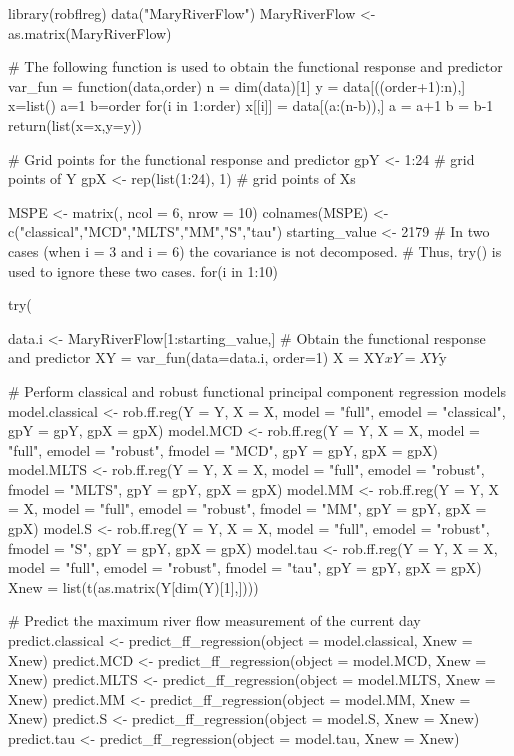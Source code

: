 \begin{smallexample}
\begin{smallverbatim}
library(robflreg)
data("MaryRiverFlow")
MaryRiverFlow <- as.matrix(MaryRiverFlow)

# The following function is used to obtain the functional response and predictor
var_fun = function(data,order){
  n = dim(data)[1]
  y = data[((order+1):n),]
  x=list()
  a=1
  b=order
  for(i in 1:order){
    x[[i]] = data[(a:(n-b)),]
    a = a+1
    b = b-1
  }
  return(list(x=x,y=y))
}

# Grid points for the functional response and predictor
gpY <- 1:24 # grid points of Y
gpX <- rep(list(1:24), 1) # grid points of Xs

MSPE <- matrix(, ncol = 6, nrow = 10)
colnames(MSPE) <- c("classical","MCD","MLTS","MM","S","tau")
starting_value <- 2179
# In two cases (when i = 3 and i = 6) the covariance is not decomposed.
# Thus, try() is used to ignore these two cases.
for(i in 1:10){
  try({
  data.i <- MaryRiverFlow[1:starting_value,]
  # Obtain the functional response and predictor
  XY = var_fun(data=data.i, order=1)
  X = XY$x
  Y = XY$y

  # Perform classical and robust functional principal component regression models
  model.classical <- rob.ff.reg(Y = Y, X = X, model = "full", emodel = "classical",
                         gpY = gpY, gpX = gpX)
  model.MCD <- rob.ff.reg(Y = Y, X = X, model = "full", emodel = "robust",
                         fmodel = "MCD", gpY = gpY, gpX = gpX)
  model.MLTS <- rob.ff.reg(Y = Y, X = X, model = "full", emodel = "robust",
                         fmodel = "MLTS", gpY = gpY, gpX = gpX)
  model.MM <- rob.ff.reg(Y = Y, X = X, model = "full", emodel = "robust",
                         fmodel = "MM", gpY = gpY, gpX = gpX)
  model.S <- rob.ff.reg(Y = Y, X = X, model = "full", emodel = "robust",
                         fmodel = "S", gpY = gpY, gpX = gpX)
  model.tau <- rob.ff.reg(Y = Y, X = X, model = "full", emodel = "robust",
                         fmodel = "tau", gpY = gpY, gpX = gpX)
  Xnew = list(t(as.matrix(Y[dim(Y)[1],])))
  
  # Predict the maximum river flow measurement of the current day
  predict.classical <- predict_ff_regression(object = model.classical, Xnew = Xnew)
  predict.MCD <- predict_ff_regression(object = model.MCD, Xnew = Xnew)
  predict.MLTS <- predict_ff_regression(object = model.MLTS, Xnew = Xnew)
  predict.MM <- predict_ff_regression(object = model.MM, Xnew = Xnew)
  predict.S <- predict_ff_regression(object = model.S, Xnew = Xnew)
  predict.tau <- predict_ff_regression(object = model.tau, Xnew = Xnew)

}}
\end{smallverbatim}
\end{smallexample}
